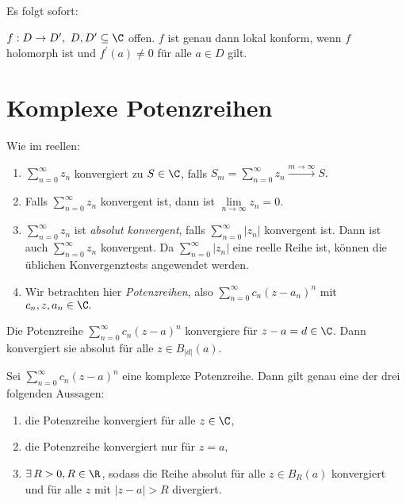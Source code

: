 		Es folgt sofort:
		\begin{thm}
			$f: D \to D^\prime,\ D,D^\prime \subseteq \C$ offen. $f$ ist genau dann lokal konform, wenn $f$ holomorph ist und $f^\prime(a) \neq 0$ für alle $a \in D$ gilt.
		\end{thm}
		
	
	\section{Komplexe Potenzreihen}
		
		Wie im reellen:
		\begin{enumerate}
			\item $ \sum\limits_{n=0}^\infty z_n $ konvergiert zu $S \in \C$, falls $ S_m = \sum\limits_{n=0}^\infty z_n \overset{m \to \infty}{\longrightarrow} S. $
			\item Falls $\sum\limits_{n=0}^\infty z_n $ konvergent ist, dann ist $ \lim\limits_{n \to \infty} z_n = 0. $
			\item  $\sum\limits_{n=0}^\infty z_n $ ist \emph{absolut konvergent}, falls $\sum\limits_{n=0}^\infty |z_n| $ konvergent ist. Dann ist auch $ \sum\limits_{n=0}^\infty z_n $ konvergent. Da $\sum\limits_{n=0}^\infty |z_n| $ eine reelle Reihe ist, können die üblichen Konvergenztests angewendet werden.
			\item Wir betrachten hier \emph{Potenzreihen}, also $\sum\limits_{n=0}^\infty c_n (z-a_n)^n $ mit $ c_n, z, a_n \in \C. $
		\end{enumerate}
		
		\begin{thm}
			Die Potenzreihe $ \sum\limits_{n=0}^\infty c_n (z-a)^n $ konvergiere für $ z-a = d \in \C $. Dann konvergiert sie absolut für alle $ z \in B_{|d|}(a) $.
		\end{thm}
		
		\begin{cor}\label{cor_pot}
			Sei $ \sum\limits_{n=0}^\infty c_n (z-a)^n $ eine komplexe Potenzreihe. Dann gilt genau eine der drei folgenden Aussagen:
			\begin{enumerate}[label={\roman*})]
				\item die Potenzreihe konvergiert für alle $z \in \C$,
				\item die Potenzreihe konvergiert nur für $z = a$,
				\item $ \exists\, R > 0, R \in \R $, sodass die Reihe absolut für alle $z \in B_R(a)$ konvergiert und für alle $ z $ mit $ |z-a|>R $ divergiert.
			\end{enumerate}
		\end{cor}
		
